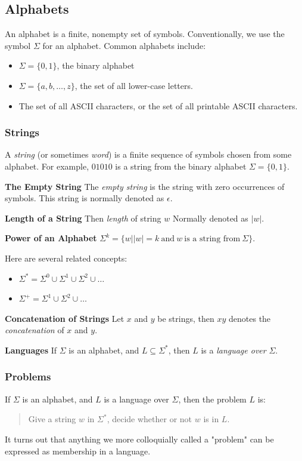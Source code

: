 \documentclass[12pt,reqno]{amsart}
\begin{document}
\subsection{Alphabets}
An alphabet is a finite, nonempty set of symbols. Conventionally, we use the symbol $\Sigma$ for an alphabet. Common alphabets include:
\begin{itemize}
	\item $\Sigma = \{0,1\}$, the binary alphabet
	\item $\Sigma = \{a, b, \ldots, z\}$, the set of all lower-case letters.
	\item The set of all ASCII characters, or the set of all printable ASCII characters.
\end{itemize}

\subsubsection{Strings}
A \textit{string} (or sometimes \textit{word}) is a finite sequence of symbols chosen from some alphabet. For example, $01010$ is a string from the binary alphabet $\Sigma = \{0,1\}$.

\textbf{The Empty String}
The \textit{empty string} is the string with zero occurrences of symbols. This string is normally denoted as $\epsilon$.

\textbf{Length of a String}
Then \textit{length} of string $w$ Normally denoted as $|w|$. 

\textbf{Power of an Alphabet}
$\Sigma^k = \{w \big | |w| = k ~\mbox{and}~ w~ \mbox{is a string from} ~\Sigma \} $.

Here are several related concepts:
\begin{itemize}

	\item $\Sigma^* = \Sigma^0 \cup \Sigma^1 \cup \Sigma^2 \cup \ldots$

	\item $\Sigma^+ = \Sigma^1 \cup \Sigma^2 \cup \ldots$
\end{itemize}

\textbf{Concatenation of Strings}
Let $x$ and $y$ be strings, then $xy$ denotes the \textit{concatenation} of $x$ and $y$.

\textbf{Languages}
If $\Sigma$ is an alphabet, and $L \subseteq \Sigma^*$, then $L$ is a \textit{language over} $\Sigma$. 

\subsubsection{Problems}
If $\Sigma$ is an alphabet, and $L$ is a language over $\Sigma$, then the problem $L$ is:
\begin{quote}
	Give a string $w$ in $\Sigma^*$, decide whether or not $w$ is in $L$.
\end{quote}
It turns out that anything we more colloquially called a "problem" can be expressed as membership in a language.
\end{document}
